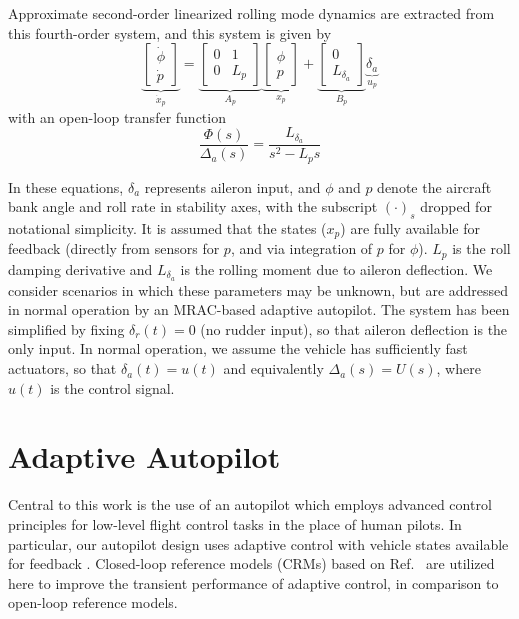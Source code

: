 Approximate second-order linearized rolling mode dynamics are extracted from this fourth-order system, and this system is given by
\begin{equation}
	\underbrace{\begin{bmatrix}
			\dot{\phi} \\ \dot{p}
		\end{bmatrix}}_{\dot{x}_p} = \underbrace{\begin{bmatrix}
			0 & 1 \\ 0 & L_p
		\end{bmatrix}}_{A_p} \underbrace{\begin{bmatrix}
			\phi \\ p
		\end{bmatrix}}_{x_p} + \underbrace{\begin{bmatrix}
			0 \\ L_{\delta_a}
		\end{bmatrix}}_{B_p} \underbrace{\delta_a}_{u_p}
	\label{eqn:2nd_order_lateral}
\end{equation} \noindent with an open-loop transfer function
\begin{equation}
		\frac{\Phi(s)}{\Delta_a(s)} = \frac{L_{\delta_a}}{s^2 - L_p s}
\end{equation}

In these equations, $\delta_a$ represents aileron input, and $\phi$ and $p$ denote the aircraft bank angle and roll rate in stability axes, with the subscript $(\cdot)_s$ dropped for notational simplicity. It is assumed that the states ($x_p$) are fully available for feedback (directly from sensors for $p$, and via integration of $p$ for $\phi$). $L_p$ is the roll damping derivative and $L_{\delta_a}$ is the rolling moment due to aileron deflection. We consider scenarios in which these parameters may be unknown, but are addressed in normal operation by an MRAC-based adaptive autopilot. The system has been simplified by fixing $\delta_r(t) = 0$ (no rudder input), so that aileron deflection is the only input. In normal operation, we assume the vehicle has sufficiently fast actuators, so that $\delta_a(t) = u(t)$ and equivalently $\Delta_a(s) = U(s)$, where $u(t)$ is the control signal. 



\section{Adaptive Autopilot} \label{sec:siso_sc_adaptive}
Central to this work is the use of an autopilot which employs advanced control principles for low-level flight control tasks in the place of human pilots. In particular, our autopilot design uses adaptive control with vehicle states available for feedback \cite{narendra2012stable}. Closed-loop reference models (CRMs) based on Ref.~\cite{gibson2013adaptive} are utilized here to improve the transient performance of adaptive control, in comparison to open-loop reference models.

